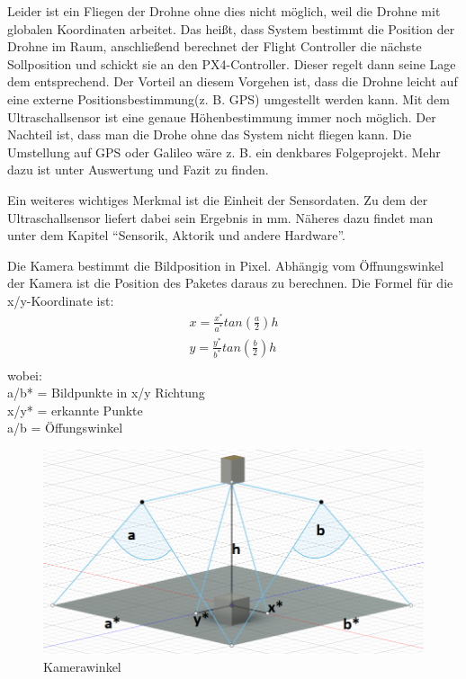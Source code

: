 Leider ist ein Fliegen der Drohne ohne dies nicht möglich, weil die Drohne mit globalen Koordinaten arbeitet. Das heißt, dass System bestimmt die Position der Drohne im Raum, anschließend berechnet der Flight Controller die nächste Sollposition und schickt sie an den PX4-Controller. Dieser regelt dann seine Lage dem entsprechend. Der Vorteil an diesem Vorgehen ist, dass die Drohne leicht auf eine externe Positionsbestimmung(z. B. GPS) umgestellt werden kann. 
Mit dem Ultraschallsensor ist eine genaue Höhenbestimmung immer noch möglich. Der Nachteil ist, dass man die Drohe ohne das System nicht fliegen kann. Die Umstellung auf GPS oder Galileo wäre z. B. ein denkbares Folgeprojekt. Mehr dazu ist unter Auswertung und Fazit zu finden.

Ein weiteres wichtiges Merkmal ist die Einheit der Sensordaten. Zu dem der Ultraschallsensor liefert dabei sein Ergebnis in mm. Näheres dazu findet man unter dem Kapitel ``Sensorik, Aktorik und andere Hardware''.

Die Kamera bestimmt die Bildposition in Pixel. Abhängig vom Öffnungswinkel der Kamera ist die Position des Paketes daraus zu berechnen.
Die Formel für die x/y-Koordinate ist:
\begin{equation}
\begin{split}
x = \frac{x^*}{a^*} tan(\frac{a}{2}) h\\
y = \frac{y^*}{b^*} tan(\frac{b}{2}) h\\
\end{split}
\end{equation}
wobei:\\
a/b* = Bildpunkte in x/y Richtung\\
x/y* = erkannte Punkte\\
a/b = Öffungswinkel\\

\begin{figure}[h]
	\centering
	\includegraphics[scale=0.3]{"Grafiken/Kameraformel.png"}
	\caption{Kamerawinkel}
	\label{fig:kameraformel}
\end{figure}
